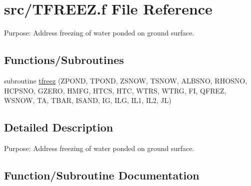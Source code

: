 \hypertarget{TFREEZ_8f}{}\section{src/\+T\+F\+R\+E\+E\+Z.f File Reference}
\label{TFREEZ_8f}


Purpose\+: Address freezing of water ponded on ground surface.  


\subsection*{Functions/\+Subroutines}
\begin{DoxyCompactItemize}
\item 
subroutine \hyperlink{TFREEZ_8f_a4bbb5275f553d198b8e0d750e75d3c3d}{tfreez} (Z\+P\+O\+N\+D, T\+P\+O\+N\+D, Z\+S\+N\+O\+W, T\+S\+N\+O\+W, A\+L\+B\+S\+N\+O, R\+H\+O\+S\+N\+O, H\+C\+P\+S\+N\+O, G\+Z\+E\+R\+O, H\+M\+F\+G, H\+T\+C\+S, H\+T\+C, W\+T\+R\+S, W\+T\+R\+G, F\+I, Q\+F\+R\+E\+Z, W\+S\+N\+O\+W, T\+A, T\+B\+A\+R, I\+S\+A\+N\+D, I\+G, I\+L\+G, I\+L1, I\+L2, J\+L)
\end{DoxyCompactItemize}


\subsection{Detailed Description}
Purpose\+: Address freezing of water ponded on ground surface. 



\subsection{Function/\+Subroutine Documentation}
\hypertarget{TFREEZ_8f_a4bbb5275f553d198b8e0d750e75d3c3d}{}
